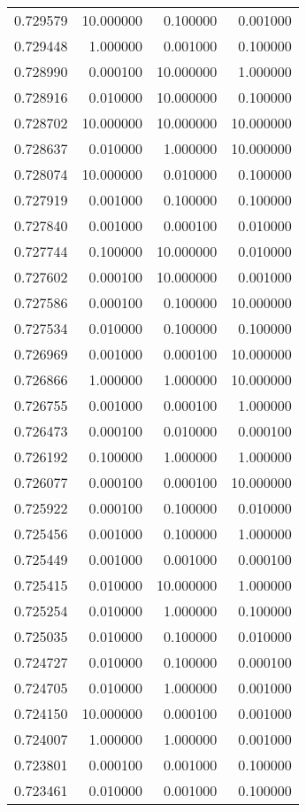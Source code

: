 \begin{tabular}{rrrr}
0.729579 & 10.000000 & 0.100000 & 0.001000 \\
0.729448 & 1.000000 & 0.001000 & 0.100000 \\
0.728990 & 0.000100 & 10.000000 & 1.000000 \\
0.728916 & 0.010000 & 10.000000 & 0.100000 \\
0.728702 & 10.000000 & 10.000000 & 10.000000 \\
0.728637 & 0.010000 & 1.000000 & 10.000000 \\
0.728074 & 10.000000 & 0.010000 & 0.100000 \\
0.727919 & 0.001000 & 0.100000 & 0.100000 \\
0.727840 & 0.001000 & 0.000100 & 0.010000 \\
0.727744 & 0.100000 & 10.000000 & 0.010000 \\
0.727602 & 0.000100 & 10.000000 & 0.001000 \\
0.727586 & 0.000100 & 0.100000 & 10.000000 \\
0.727534 & 0.010000 & 0.100000 & 0.100000 \\
0.726969 & 0.001000 & 0.000100 & 10.000000 \\
0.726866 & 1.000000 & 1.000000 & 10.000000 \\
0.726755 & 0.001000 & 0.000100 & 1.000000 \\
0.726473 & 0.000100 & 0.010000 & 0.000100 \\
0.726192 & 0.100000 & 1.000000 & 1.000000 \\
0.726077 & 0.000100 & 0.000100 & 10.000000 \\
0.725922 & 0.000100 & 0.100000 & 0.010000 \\
0.725456 & 0.001000 & 0.100000 & 1.000000 \\
0.725449 & 0.001000 & 0.001000 & 0.000100 \\
0.725415 & 0.010000 & 10.000000 & 1.000000 \\
0.725254 & 0.010000 & 1.000000 & 0.100000 \\
0.725035 & 0.010000 & 0.100000 & 0.010000 \\
0.724727 & 0.010000 & 0.100000 & 0.000100 \\
0.724705 & 0.010000 & 1.000000 & 0.001000 \\
0.724150 & 10.000000 & 0.000100 & 0.001000 \\
0.724007 & 1.000000 & 1.000000 & 0.001000 \\
0.723801 & 0.000100 & 0.001000 & 0.100000 \\
0.723461 & 0.010000 & 0.001000 & 0.100000 \\

\end{tabular}
